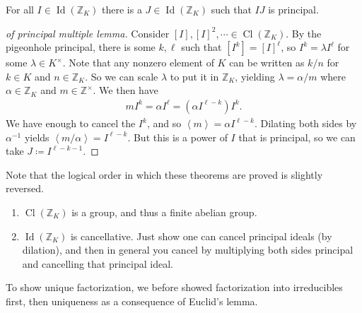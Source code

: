 \begin{lemma}

For all \(I\in \operatorname{Id}({\mathbb{Z}}_K)\) there is a
\(J \in \operatorname{Id}({\mathbb{Z}}_K)\) such that \(IJ\) is
principal.

\end{lemma}

\begin{proof}[of principal multiple lemma]

Consider
\([I], [I]^2, \cdots \in { \operatorname{Cl}} ({\mathbb{Z}}_K)\). By the
pigeonhole principal, there is some \(k, \ell\) such that
\([I^k] = [I]^\ell\), so \(I^k = \lambda I^\ell\) for some
\(\lambda \in K^{\times}\). Note that any nonzero element of \(K\) can
be written as \(k/n\) for \(k\in K\) and \(n\in {\mathbb{Z}}_K\). So we
can scale \(\lambda\) to put it in \({\mathbb{Z}}_K\), yielding
\(\lambda = \alpha/m\) where \(\alpha\in {\mathbb{Z}}_K\) and
\(m\in {\mathbb{Z}}^{\times}\). We then have
\begin{align*}
mI^k = \alpha I^\ell = (\alpha I^{\ell-k})I^k
.\end{align*}
We have enough to cancel the \(I^k\), and so
\(\left\langle{ m }\right\rangle= \alpha I^{\ell - k}\). Dilating both
sides by \(\alpha^{-1}\) yields
\(\left\langle{ m/\alpha }\right\rangle = I^{\ell-k}\). But this is a
power of \(I\) that is principal, so we can take
\(J \coloneqq I^{\ell-k-1}\).

\end{proof}

\begin{remark}

Note that the logical order in which these theorems are proved is
slightly reversed.

\end{remark}

\begin{corollary}

\envlist

\begin{enumerate}
\def\labelenumi{\alph{enumi}.}
\item
  \({ \operatorname{Cl}} ({\mathbb{Z}}_K)\) is a group, and thus a
  finite abelian group.
\item
  \(\operatorname{Id}({\mathbb{Z}}_K)\) is cancellative. Just show one
  can cancel principal ideals (by dilation), and then in general you
  cancel by multiplying both sides principal and cancelling that
  principal ideal.
\end{enumerate}

To show unique factorization, we before showed factorization into
irreducibles first, then uniqueness as a consequence of Euclid's lemma.

\end{corollary}

